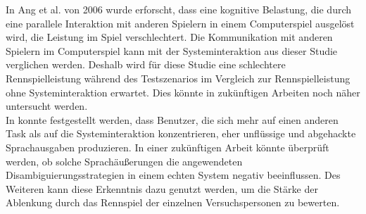 \documentclass[12pt,a4paper]{scrartcl}
\begin{document}
In Ang et al. von 2006 wurde erforscht, dass eine kognitive Belastung, die durch eine parallele Interaktion mit anderen Spielern in einem Computerspiel ausgelöst wird, die Leistung im Spiel verschlechtert.  Die Kommunikation mit anderen Spielern im Computerspiel kann mit der Systeminteraktion aus dieser Studie verglichen werden. Deshalb wird für diese Studie eine schlechtere Rennspielleistung während des Testszenarios im Vergleich zur Rennspielleistung ohne Systeminteraktion erwartet. Dies könnte in zukünftigen Arbeiten noch näher untersucht werden.\\
 In \cite{Wozhcd} konnte festgestellt werden, dass Benutzer, die sich mehr auf einen anderen Task als auf die Systeminteraktion konzentrieren, eher unflüssige und abgehackte Sprachausgaben produzieren. In einer zukünftigen Arbeit könnte überprüft werden, ob solche Sprachäußerungen die angewendeten Disambiguierungsstrategien in einem echten System negativ beeinflussen.
Des Weiteren kann diese Erkenntnis dazu genutzt werden, um die Stärke der Ablenkung durch das Rennspiel der einzelnen Versuchspersonen zu bewerten. 
\end{document}
